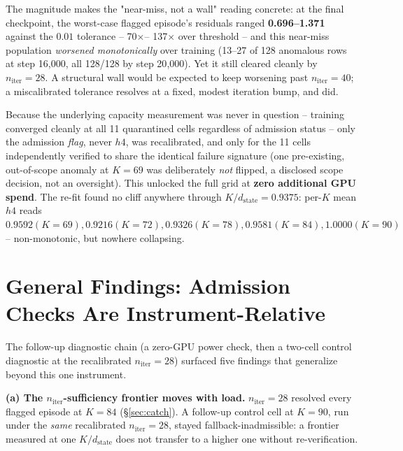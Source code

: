 \documentclass[10pt,letterpaper]{article}
\newcommand{\dstate}{d_{\mathrm{state}}}
\newcommand{\niter}{n_{\mathrm{iter}}}
\begin{document}
The magnitude makes the "near-miss, not a wall" reading concrete: at the
final checkpoint, the worst-case flagged episode's residuals ranged
\textbf{0.696--1.371} against the $0.01$ tolerance -- 70$\times$--
137$\times$ over threshold -- and this near-miss population
\emph{worsened monotonically} over training (13--27 of 128 anomalous rows
at step 16{,}000, all 128/128 by step 20{,}000). Yet it still cleared
cleanly by $\niter=28$. A structural wall would be expected to keep
worsening past $\niter=40$; a miscalibrated tolerance resolves at a
fixed, modest iteration bump, and did.

Because the underlying capacity measurement was never in question --
training converged cleanly at all 11 quarantined cells regardless of
admission status -- only the admission \emph{flag}, never $h4$, was
recalibrated, and only for the 11 cells independently verified to share
the identical failure signature (one pre-existing, out-of-scope anomaly
at $K{=}69$ was deliberately \emph{not} flipped, a disclosed scope
decision, not an oversight). This unlocked the full grid at
\textbf{zero additional GPU spend}. The re-fit found no cliff anywhere
through $K/\dstate=0.9375$: per-$K$ mean $h4$ reads
$0.9592 (K{=}69), 0.9216 (K{=}72), 0.9326 (K{=}78), 0.9581 (K{=}84),
1.0000 (K{=}90)$ -- non-monotonic, but nowhere collapsing.

\section{General Findings: Admission Checks Are Instrument-Relative}
\label{sec:findings}

The follow-up diagnostic chain (a zero-GPU power check, then a two-cell
control diagnostic at the recalibrated $\niter=28$) surfaced five findings
that generalize beyond this one instrument.

\textbf{(a) The $\niter$-sufficiency frontier moves with load.}
$\niter=28$ resolved every flagged episode at $K{=}84$ (\S\ref{sec:catch}).
A follow-up control cell at $K{=}90$, run under the \emph{same}
recalibrated $\niter=28$, stayed fallback-inadmissible: a frontier
measured at one $K/\dstate$ does not transfer to a higher one without
re-verification.
\end{document}
